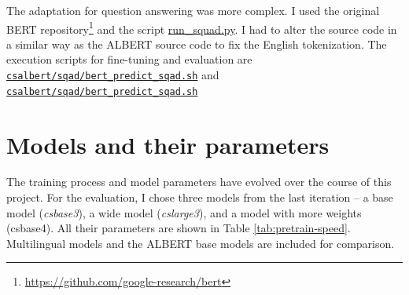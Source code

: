 \documentclass[
  printed, %
  color,   %
  table,   %
  oneside, %
  lof,     %
  lot,     %
]{fithesis3}
\begin{document}
The adaptation for question answering was more complex. I used the original BERT repository\footnote{\url{https://github.com/google-research/bert}} and the script \href{https://github.com/google-research/bert/blob/master/run_squad.py}{run\_squad.py}. I had to alter the source code in a similar way as the ALBERT source code to fix the English tokenization. The execution scripts for fine-tuning and evaluation are \href{https://github.com/ZepZep/csalbert/blob/master/sqad/bert_train_sqad.sh}
    {\texttt{csalbert/sqad/bert\_predict\_sqad.sh}} and 
\href{https://github.com/ZepZep/csalbert/blob/master/sqad/bert_train_sqad.sh}
    {\texttt{csalbert/\linebreak{}sqad/bert\_predict\_sqad.sh}}

\section{Models and their parameters}

The training process and model parameters have evolved over the course of this project. For the evaluation, I chose three models from the last iteration -- a base model (\textit{csbase3}), a wide model (\textit{cslarge3}), and a model with more weights (csbase4). All their parameters are shown in Table \ref{tab:pretrain-speed}. Multilingual models and the ALBERT base models are included for comparison.

\begin{table}[h]
\centering
\footnotesize
{}
\caption[Model parameters, size and speed]
{Model parameters, size, pretraining parameters, and speed.}
\label{tab:pretrain-speed}
\end{table}
\end{document}
